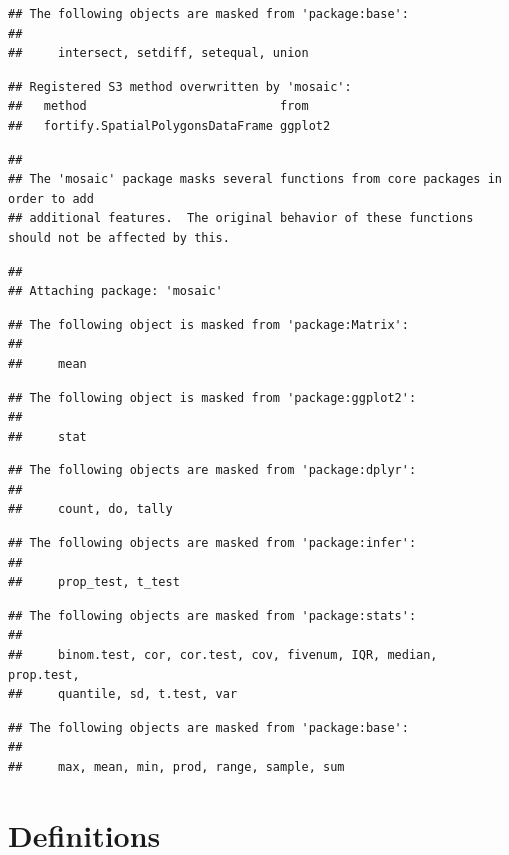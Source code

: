 \documentclass[
]{book}
\begin{document}
\begin{verbatim}
## The following objects are masked from 'package:base':
## 
##     intersect, setdiff, setequal, union
\end{verbatim}

\begin{verbatim}
## Registered S3 method overwritten by 'mosaic':
##   method                           from   
##   fortify.SpatialPolygonsDataFrame ggplot2
\end{verbatim}

\begin{verbatim}
## 
## The 'mosaic' package masks several functions from core packages in order to add 
## additional features.  The original behavior of these functions should not be affected by this.
\end{verbatim}

\begin{verbatim}
## 
## Attaching package: 'mosaic'
\end{verbatim}

\begin{verbatim}
## The following object is masked from 'package:Matrix':
## 
##     mean
\end{verbatim}

\begin{verbatim}
## The following object is masked from 'package:ggplot2':
## 
##     stat
\end{verbatim}

\begin{verbatim}
## The following objects are masked from 'package:dplyr':
## 
##     count, do, tally
\end{verbatim}

\begin{verbatim}
## The following objects are masked from 'package:infer':
## 
##     prop_test, t_test
\end{verbatim}

\begin{verbatim}
## The following objects are masked from 'package:stats':
## 
##     binom.test, cor, cor.test, cov, fivenum, IQR, median, prop.test,
##     quantile, sd, t.test, var
\end{verbatim}

\begin{verbatim}
## The following objects are masked from 'package:base':
## 
##     max, mean, min, prod, range, sample, sum
\end{verbatim}

\chapter{Definitions}\label{definitions}
\end{document}
